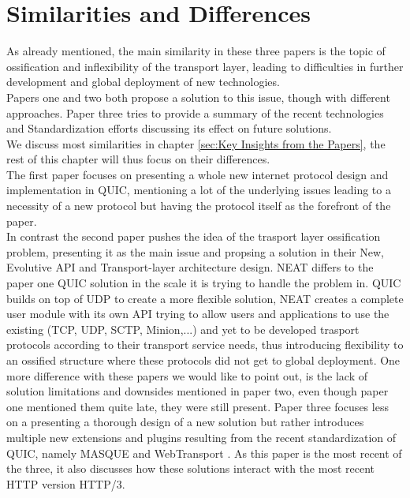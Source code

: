 \section{Similarities and Differences}%
\label{sec:Similarities and Differences}
As already mentioned, the main similarity in these three papers is the topic of ossification and inflexibility of the transport layer, leading to difficulties in further development and global deployment of new technologies. \\
Papers one and two both propose a solution to this issue, though with different approaches. Paper three tries to provide a summary of the recent technologies and Standardization efforts discussing its effect on future solutions.\\
We discuss most similarities in chapter \ref{sec:Key Insights from the Papers}, the rest of this chapter will thus focus on their differences.\\
The first paper focuses on presenting a whole new internet protocol design and implementation in QUIC, mentioning a lot of the underlying issues leading to a necessity of a new protocol but having the protocol itself as the forefront of the paper.\\
In contrast the second paper pushes the idea of the trasport layer ossification problem, presenting it as the main issue and propsing a solution in their New, Evolutive API and Transport-layer architecture design. NEAT differs to the paper one QUIC solution in the scale it is trying to handle the problem in. QUIC builds on top of UDP to create a more flexible solution, NEAT creates a complete user module with its own API trying to allow users and applications to use the existing (TCP, UDP, SCTP, Minion,...) and yet to be developed trasport protocols \cite{grinnemo2016towards} according to their transport service needs, thus introducing flexibility to an ossified structure where these protocols did not get to global deployment. One more difference with these papers we would like to point out, is the lack of solution limitations and downsides mentioned in paper two, even though paper one mentioned them quite late, they were still present.
Paper three focuses less on a presenting a thorough design of a new solution but rather introduces multiple new extensions and plugins resulting from the recent standardization of QUIC, namely MASQUE and WebTransport \cite{kosek2021beyond}. As this paper is the most recent of the three, it also discusses how these solutions interact with the most recent HTTP version HTTP/3.

